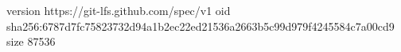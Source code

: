 version https://git-lfs.github.com/spec/v1
oid sha256:6787d7fc75823732d94a1b2ec22ed21536a2663b5c99d979f4245584c7a00cd9
size 87536
